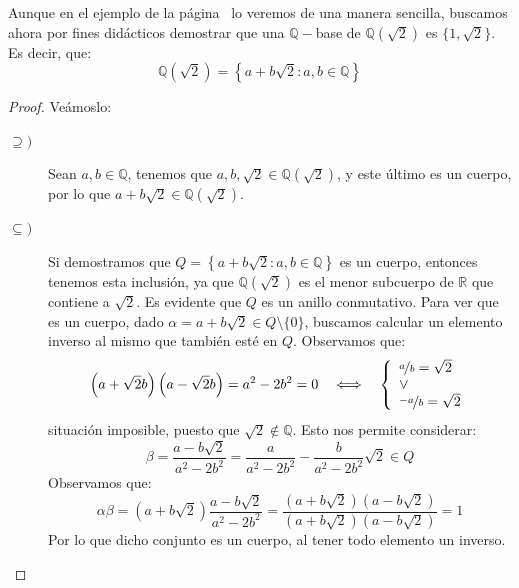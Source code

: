 \begin{ejemplo}
    Aunque en el ejemplo de la página~\pageref{ej:baseQsqrt2} lo veremos de una manera sencilla, buscamos ahora por fines didácticos demostrar que una $\mathbb{Q}-$base de $\mathbb{Q}\left(\sqrt{2}\right)$ es $\{1,\sqrt{2}\}$. Es decir, que:
    \begin{equation*}
        \mathbb{Q}\left(\sqrt{2}\right) = \left\{a+b\sqrt{2} : a,b\in \mathbb{Q}\right\}
    \end{equation*}
    \begin{proof}
        Veámoslo:
        \begin{description}
            \item [$\supseteq)$] Sean $a,b\in \mathbb{Q}$, tenemos que $a,b,\sqrt{2}\in \mathbb{Q}\left(\sqrt{2}\right)$, y este último es un cuerpo, por lo que $a+b\sqrt{2}\in \mathbb{Q}\left(\sqrt{2}\right)$.
            \item [$\subseteq)$] Si demostramos que $Q=\left\{a+b\sqrt{2}:a,b\in \mathbb{Q}\right\}$ es un cuerpo, entonces tenemos esta inclusión, ya que $\mathbb{Q}\left(\sqrt{2}\right)$ es el menor subcuerpo de $\mathbb{R}$ que contiene a $\sqrt{2}$. Es evidente que $Q$ es un anillo conmutativo. Para ver que es un cuerpo, dado $\alpha=a+b\sqrt{2}\in Q\setminus\{0\}$, buscamos calcular un elemento inverso al mismo que también esté en $Q$. Observamos que:
                \begin{equation*}
                    \left(a+\sqrt{2}b\right)\left(a-\sqrt{2}b\right) = a^2-2b^2 = 0 \quad \Longleftrightarrow\quad  \left\{\begin{array}{l}
                        \nicefrac{a}{b} = \sqrt{2} \\
                        \lor \\
                        \nicefrac{-a}{b} = \sqrt{2}
                    \end{array}\right.
                \end{equation*}
                situación imposible, puesto que $\sqrt{2}\notin \mathbb{Q}$. Esto nos permite considerar:
                \begin{equation*}
                \beta =\dfrac{a-b\sqrt{2}}{a^2-2b^2} = \dfrac{a}{a^2-2b^2} - \dfrac{b}{a^2-2b^2}\sqrt{2}  \in Q
                \end{equation*}
                Observamos que:
                \begin{equation*}
                    \alpha \beta = \left(a+b\sqrt{2}\right) \dfrac{a-b\sqrt{2}}{a^2-2b^2} = \dfrac{\left(a+b\sqrt{2}\right)\left(a-b\sqrt{2}\right)}{\left(a+b\sqrt{2}\right)\left(a-b\sqrt{2}\right)} = 1
                \end{equation*}
                Por lo que dicho conjunto es un cuerpo, al tener todo elemento un inverso.
        \end{description}
    \end{proof}



\end{ejemplo}

